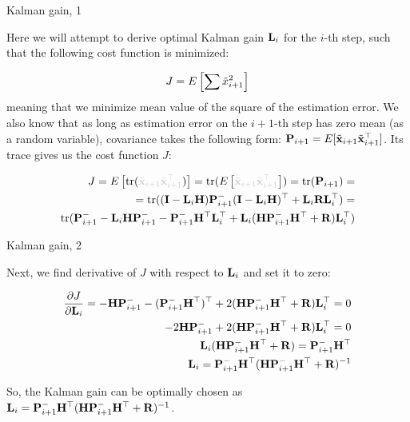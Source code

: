 \documentclass{beamer}
\newcommand{\btil}[1] {\Tilde{\mathbf{#1}}}
\begin{document}
\begin{frame}{Kalman gain, 1}
	\begin{flushleft}
		
		Here we will attempt to derive optimal Kalman gain $\mathbf{L}_i$ for the $i$-th step, such that the following cost function is minimized:
		
		\begin{equation}
			J = E \left[ \sum \Tilde x_{i+1}^2  \right]
		\end{equation}
		meaning that we minimize mean value of the square of the estimation error. We also know that as long as estimation error on the $i+1$-th step has zero mean (as a random variable), covariance takes the following form: $\bo{P}_{i+1} = E [ \btil{x}_{i+1} \btil{x}_{i+1}\T ]$. Its trace gives us the cost function $J$:
		
		
		
		\begin{align*}
			J = E \left[ \text{tr}(\textcolor{mygray}{
				\btil{x}_{i+1} \btil{x}_{i+1}\T})  \right] =
			\text{tr} (E \left[ \textcolor{mygray}{
				\btil{x}_{i+1} \btil{x}_{i+1}\T}  \right]) = 
				\text{tr} (\bo{P}_{i+1} ) =
				\\
			= \text{tr}(
			(\bo{I} - \bo{L}_i \bo{H}) \bo{P}_{i+1}^- (\bo{I} - \bo{L}_i \bo{H})\T +\bo{L}_i\bo{R}\bo{L}_i\T
			) = \\
			\text{tr}(
			\bo{P}_{i+1}^- - \bo{L}_i \bo{H} \bo{P}_{i+1}^- 
			- \bo{P}_{i+1}^- \bo{H}\T \bo{L}_i\T
			+ \bo{L}_i (\bo{H}\bo{P}_{i+1}^- \bo{H}\T + \bo{R}) \bo{L}_i\T
			)
		\end{align*}		
		
		
	\end{flushleft}
\end{frame}



\begin{frame}{Kalman gain, 2}
	\begin{flushleft}
		
		Next, we find derivative of $J$ with respect to $\mathbf{L}_i$ and set it to zero:
		
		\begin{align*}
			\frac{\partial J}{\partial \mathbf{L}_i} 
			= 
			-\mathbf{H} \mathbf{P}_{i+1}^- -(\mathbf{P}_{i+1}^- \mathbf{H}^\top)^\top + 
			2(\mathbf{H}\mathbf{P}_{i+1}^- \mathbf{H}^\top + \mathbf{R}) \mathbf{L}_i^\top = 0
			\\
			-2 \mathbf{H} \mathbf{P}_{i+1}^- + 2(\mathbf{H}\mathbf{P}_{i+1}^- \mathbf{H}^\top + \mathbf{R}) \mathbf{L}_i^\top = 0
			\\
			\mathbf{L}_i (\mathbf{H}\mathbf{P}_{i+1}^- \mathbf{H}^\top + \mathbf{R}) = \mathbf{P}_{i+1}^- \mathbf{H}^\top
			\\
			\mathbf{L}_i = \mathbf{P}_{i+1}^- \mathbf{H}^\top (\mathbf{H}\mathbf{P}_{i+1}^- \mathbf{H}^\top + \mathbf{R})^{-1}
		\end{align*}		
		
		
So, the Kalman gain can be optimally chosen as $\mathbf{L}_i = \mathbf{P}_{i+1}^- \mathbf{H}^\top (\mathbf{H}\mathbf{P}_{i+1}^- \mathbf{H}^\top + \mathbf{R})^{-1}$.
		
	\end{flushleft}
\end{frame}
\end{document}
